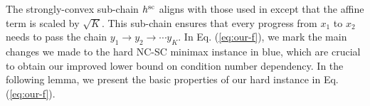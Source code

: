 \documentclass{article}
\begin{document}
The strongly-convex sub-chain $h^{\rm sc}$ aligns with those used in \citep{wang2024efficient} except that the affine term is scaled by $\sqrt{K}$. This sub-chain ensures that every progress from $x_1$ to $x_{2}$ needs to pass the chain $ y_1 \rightarrow y_2 \rightarrow \cdots y_K$.
In Eq. (\ref{eq:our-f}), we mark the main changes we made to the hard NC-SC minimax instance \citep{li2021complexity,wang2024efficient} in blue, which are crucial to obtain our improved lower bound on condition number dependency.
In the following lemma, we present the basic properties of our hard instance in Eq. (\ref{eq:our-f}).
\end{document}

